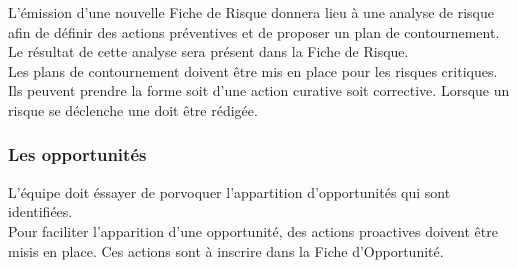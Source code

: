 L'émission d'une nouvelle Fiche de Risque donnera lieu à une analyse de risque afin de définir des actions préventives et de proposer un plan de contournement. Le résultat de cette analyse sera présent dans la Fiche de Risque. \\

Les plans de contournement doivent être mis en place pour les risques critiques. Ils peuvent prendre la forme soit d’une action curative soit corrective. Lorsque un risque se déclenche une \FFT{} doit être rédigée. \\ 

\subsubsection*{Les opportunités}

L'équipe \PICCourt doit éssayer de porvoquer l'appartition d'opportunités qui sont identifiées. \\ 

Pour faciliter l'apparition d'une opportunité, des actions proactives doivent être misis en place. Ces actions sont à inscrire dans la Fiche d'Opportunité.

